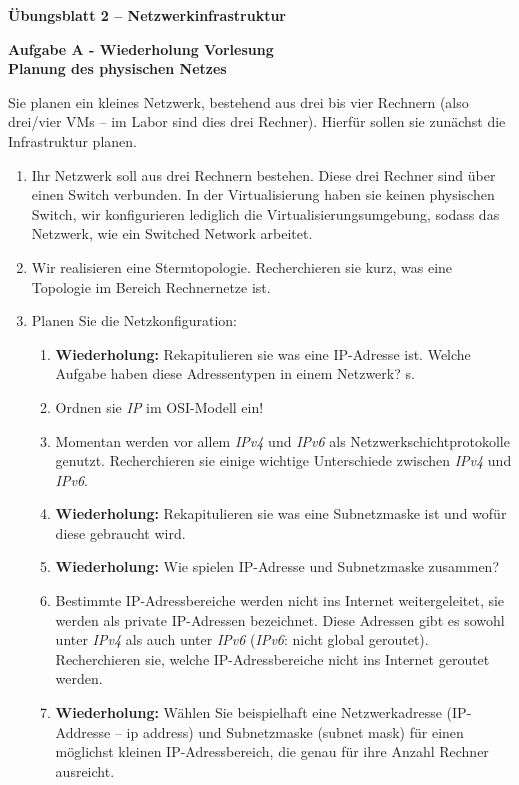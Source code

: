\documentclass[paper=a4,fontsize=11pt]{scrartcl}%
\numberwithin{equation}{section}
\begin{document}
\begin{center}
\Large{\textbf{Übungsblatt 2 -- Netzwerkinfrastruktur}}
\end{center}

\begin{center}\Large{\textbf{Aufgabe A - Wiederholung Vorlesung\\Planung des physischen Netzes}}\end{center}

Sie planen ein kleines Netzwerk, bestehend aus drei bis vier Rechnern (also drei/vier VMs -- im Labor sind dies drei Rechner). Hierfür sollen sie zunächst die Infrastruktur planen.
\begin{enumerate}
	\item Ihr Netzwerk soll aus drei Rechnern bestehen. Diese drei Rechner sind über einen Switch verbunden. In der Virtualisierung haben sie keinen physischen Switch, wir konfigurieren lediglich die Virtualisierungsumgebung, sodass das Netzwerk, wie ein Switched Network arbeitet.\\
	\item Wir realisieren eine Stermtopologie. Recherchieren sie kurz, was eine Topologie im Bereich Rechnernetze ist.
	\item Planen Sie die Netzkonfiguration:
	\begin{enumerate}
		\item  \textbf{Wiederholung:} Rekapitulieren sie was eine IP-Adresse ist. Welche Aufgabe haben diese Adressentypen in einem Netzwerk? s. \cite[S. 331ff]{Kurose2012}
		\item Ordnen sie \emph{IP} im OSI-Modell ein!
		\item Momentan werden vor allem \emph{IPv4} und \emph{IPv6} als Netzwerkschichtprotokolle genutzt. Recherchieren sie einige wichtige Unterschiede zwischen \emph{IPv4} und \emph{IPv6}.
		\item  \textbf{Wiederholung:} Rekapitulieren sie was eine Subnetzmaske ist und wofür diese gebraucht wird.
		\item \textbf{Wiederholung:} Wie spielen IP-Adresse und Subnetzmaske zusammen?
		\item Bestimmte IP-Adressbereiche werden nicht ins Internet weitergeleitet, sie werden als private IP-Adressen bezeichnet. Diese Adressen gibt es sowohl unter \emph{IPv4} als auch unter \emph{IPv6} (\emph{IPv6}: nicht global geroutet). Recherchieren sie, welche IP-Adressbereiche nicht ins Internet geroutet werden.
		\item \textbf{Wiederholung:} Wählen Sie beispielhaft eine Netzwerkadresse (IP-Addresse -- ip address) und Subnetzmaske (subnet mask) für einen möglichst kleinen IP-Adressbereich, die genau für ihre Anzahl Rechner ausreicht.\\

\end{enumerate}
\end{enumerate}
\end{document}
